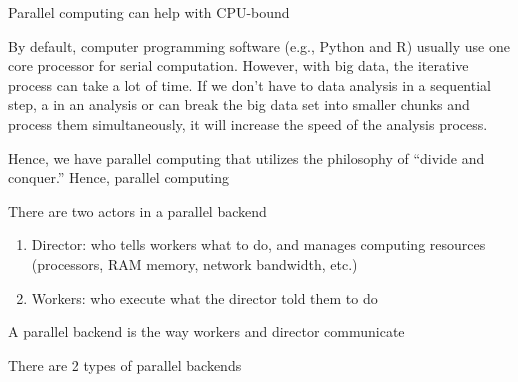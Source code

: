 \documentclass[
]{book}
\providecommand{\tightlist}{%
  \setlength{\itemsep}{0pt}\setlength{\parskip}{0pt}}
\begin{document}
Parallel computing can help with CPU-bound

By default, computer programming software (e.g., Python and R) usually use one core processor for serial computation. However, with big data, the iterative process can take a lot of time. If we don't have to data analysis in a sequential step, a in an analysis or can break the big data set into smaller chunks and process them simultaneously, it will increase the speed of the analysis process.

Hence, we have parallel computing that utilizes the philosophy of ``divide and conquer.'' Hence, parallel computing

There are two actors in a parallel backend

\begin{enumerate}
\def\labelenumi{\arabic{enumi}.}
\tightlist
\item
  Director: who tells workers what to do, and manages computing resources (processors, RAM memory, network bandwidth, etc.)
\item
  Workers: who execute what the director told them to do
\end{enumerate}

A parallel backend is the way workers and director communicate

There are 2 types of parallel backends
\end{document}
